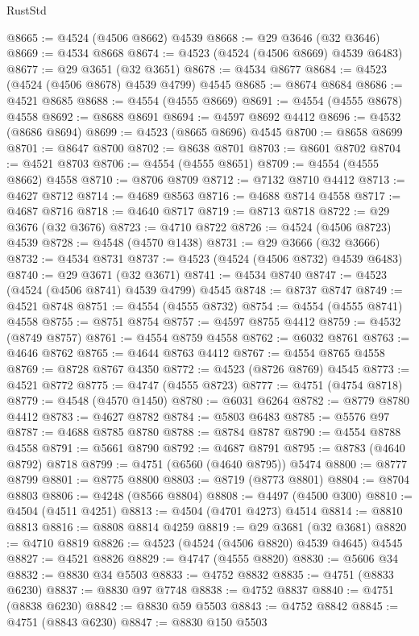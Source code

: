 \begin{lexlean}{RustStd}
\begin{coremodule}
@8665 := @4524 (@4506 @8662) @4539
@8668 := @29 @3646 (@32 @3646)
@8669 := @4534 @8668
@8674 := @4523 (@4524 (@4506 @8669) @4539 @6483)
@8677 := @29 @3651 (@32 @3651)
@8678 := @4534 @8677
@8684 := @4523 (@4524 (@4506 @8678) @4539 @4799) @4545
@8685 := @8674 @8684
@8686 := @4521 @8685
@8688 := @4554 (@4555 @8669)
@8691 := @4554 (@4555 @8678) @4558
@8692 := @8688 @8691
@8694 := @4597 @8692 @4412
@8696 := @4532 (@8686 @8694)
@8699 := @4523 (@8665 @8696) @4545
@8700 := @8658 @8699
@8701 := @8647 @8700
@8702 := @8638 @8701
@8703 := @8601 @8702
@8704 := @4521 @8703
@8706 := @4554 (@4555 @8651)
@8709 := @4554 (@4555 @8662) @4558
@8710 := @8706 @8709
@8712 := @7132 @8710 @4412
@8713 := @4627 @8712
@8714 := @4689 @8563
@8716 := @4688 @8714 @4558
@8717 := @4687 @8716
@8718 := @4640 @8717
@8719 := @8713 @8718
@8722 := @29 @3676 (@32 @3676)
@8723 := @4710 @8722
@8726 := @4524 (@4506 @8723) @4539
@8728 := @4548 (@4570 @1438)
@8731 := @29 @3666 (@32 @3666)
@8732 := @4534 @8731
@8737 := @4523 (@4524 (@4506 @8732) @4539 @6483)
@8740 := @29 @3671 (@32 @3671)
@8741 := @4534 @8740
@8747 := @4523 (@4524 (@4506 @8741) @4539 @4799) @4545
@8748 := @8737 @8747
@8749 := @4521 @8748
@8751 := @4554 (@4555 @8732)
@8754 := @4554 (@4555 @8741) @4558
@8755 := @8751 @8754
@8757 := @4597 @8755 @4412
@8759 := @4532 (@8749 @8757)
@8761 := @4554 @8759 @4558
@8762 := @6032 @8761
@8763 := @4646 @8762
@8765 := @4644 @8763 @4412
@8767 := @4554 @8765 @4558
@8769 := @8728 @8767 @4350
@8772 := @4523 (@8726 @8769) @4545
@8773 := @4521 @8772
@8775 := @4747 (@4555 @8723)
@8777 := @4751 (@4754 @8718)
@8779 := @4548 (@4570 @1450)
@8780 := @6031 @6264
@8782 := @8779 @8780 @4412
@8783 := @4627 @8782
@8784 := @5803 @6483
@8785 := @5576 @97
@8787 := @4688 @8785 @8780
@8788 := @8784 @8787
@8790 := @4554 @8788 @4558
@8791 := @5661 @8790
@8792 := @4687 @8791
@8795 := @8783 (@4640 @8792) @8718
@8799 := @4751 (@6560 (@4640 @8795)) @5474
@8800 := @8777 @8799
@8801 := @8775 @8800
@8803 := @8719 (@8773 @8801)
@8804 := @8704 @8803
@8806 := @4248 (@8566 @8804)
@8808 := @4497 (@4500 @300)
@8810 := @4504 (@4511 @4251)
@8813 := @4504 (@4701 @4273) @4514
@8814 := @8810 @8813
@8816 := @8808 @8814 @4259
@8819 := @29 @3681 (@32 @3681)
@8820 := @4710 @8819
@8826 := @4523 (@4524 (@4506 @8820) @4539 @4645) @4545
@8827 := @4521 @8826
@8829 := @4747 (@4555 @8820)
@8830 := @5606 @34
@8832 := @8830 @34 @5503
@8833 := @4752 @8832
@8835 := @4751 (@8833 @6230)
@8837 := @8830 @97 @7748
@8838 := @4752 @8837
@8840 := @4751 (@8838 @6230)
@8842 := @8830 @59 @5503
@8843 := @4752 @8842
@8845 := @4751 (@8843 @6230)
@8847 := @8830 @150 @5503

\end{coremodule}
\end{lexlean}
